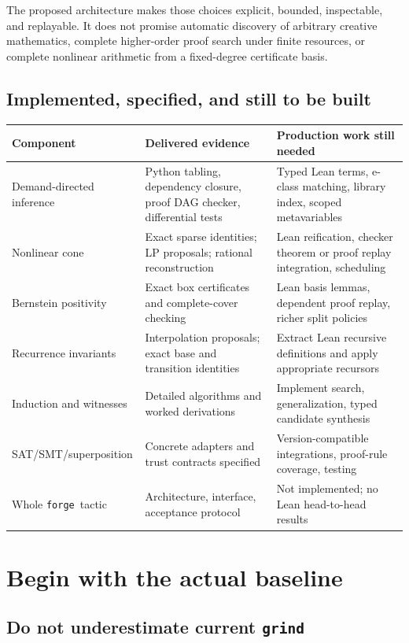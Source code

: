 \documentclass[11pt,a4paper]{article}
\newcommand{\grind}{\texttt{grind}}
\newcommand{\forge}{\texttt{forge}}
\begin{document}
The proposed architecture makes those choices explicit, bounded, inspectable,
and replayable. It does not promise automatic discovery of arbitrary creative
mathematics, complete higher-order proof search under finite resources, or
complete nonlinear arithmetic from a fixed-degree certificate basis.

\subsection{Implemented, specified, and still to be built}

\begin{center}
\begin{tabularx}{\textwidth}{@{}p{}YY@{}}
\toprule
Component & Delivered evidence & Production work still needed\\
\midrule
Demand-directed inference & Python tabling, dependency closure, proof DAG checker, differential tests & Typed Lean terms, e-class matching, library index, scoped metavariables\\
Nonlinear cone & Exact sparse identities; LP proposals; rational reconstruction & Lean reification, checker theorem or proof replay integration, scheduling\\
Bernstein positivity & Exact box certificates and complete-cover checking & Lean basis lemmas, dependent proof replay, richer split policies\\
Recurrence invariants & Interpolation proposals; exact base and transition identities & Extract Lean recursive definitions and apply appropriate recursors\\
Induction and witnesses & Detailed algorithms and worked derivations & Implement search, generalization, typed candidate synthesis\\
SAT/SMT/superposition & Concrete adapters and trust contracts specified & Version-compatible integrations, proof-rule coverage, testing\\
Whole \forge\ tactic & Architecture, interface, acceptance protocol & Not implemented; no Lean head-to-head results\\
\bottomrule
\end{tabularx}
\end{center}

\section{Begin with the actual baseline}

\subsection{Do not underestimate current \grind}
\end{document}
